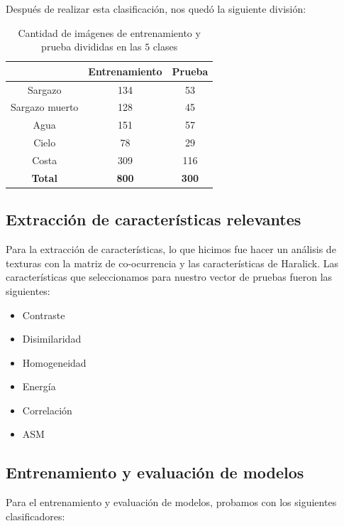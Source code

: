 \documentclass[conference]{IEEEtran}
\begin{document}
Después de realizar esta clasificación, nos quedó la siguiente división:

\begin{table}[H]
    \centering
    \begin{tabular}{|c|c|c|}
    	\hline
		 & Entrenamiento & Prueba \\ \hline
         Sargazo & 134 & 53 \\ \hline
         Sargazo muerto & 128 & 45 \\ \hline
         Agua & 151 & 57 \\ \hline
		 Cielo & 78 & 29 \\ \hline
         Costa & 309 & 116 \\ \hline
         \textbf{Total} & \textbf{800} & \textbf{300} \\ \hline                          
    \end{tabular}
    \caption{Cantidad de imágenes de entrenamiento y prueba divididas en las $5$ clases}
    \label{tab:svd_dimensions}
\end{table}



\subsection{Extracción de características relevantes}

Para la extracción de características, lo que hicimos fue hacer un análisis de texturas con la matriz de co-ocurrencia y las características de Haralick. Las características que seleccionamos para nuestro vector de pruebas fueron las siguientes:

\begin{itemize}
    \item Contraste
    \item Disimilaridad
    \item Homogeneidad
    \item Energía
    \item Correlación
    \item ASM
\end{itemize}


\subsection{Entrenamiento y evaluación de modelos }

Para el entrenamiento y evaluación de modelos, probamos con los siguientes clasificadores:
\end{document}
